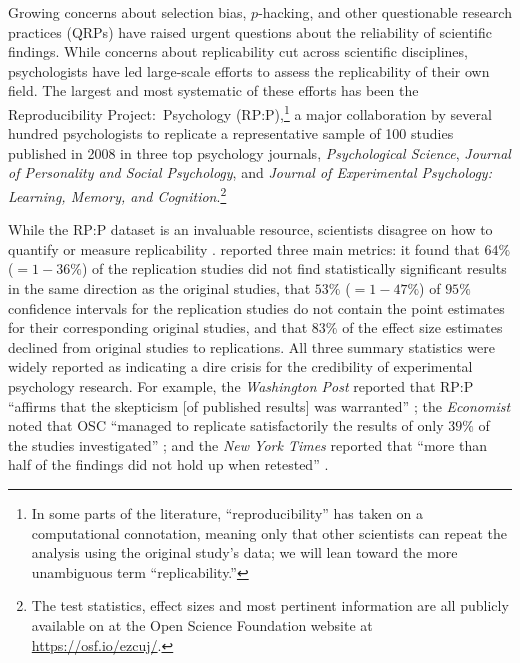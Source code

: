 \documentclass[11pt]{article}
\theoremstyle{definition}
\theoremstyle{custom}
\begin{document}
  Growing concerns about selection bias, $p$-hacking, and other questionable research practices (QRPs) have raised urgent questions about the reliability of scientific findings. While concerns about replicability cut across scientific disciplines, psychologists have led large-scale efforts to assess the replicability of their own field. The largest and most systematic of these efforts has been the Reproducibility Project:\ Psychology (RP:P),\footnote{In some parts of the literature, ``reproducibility'' has taken on a computational connotation, meaning only that other scientists can repeat the analysis using the original study's data; we will lean toward the more unambiguous term ``replicability.''} a major collaboration by several hundred psychologists to replicate a representative sample of 100 studies published in 2008 in three top psychology journals, {\em Psychological Science}, {\em Journal of Personality and Social Psychology}, and {\em Journal of Experimental Psychology: Learning, Memory, and Cognition}.\footnote{The test statistics, effect sizes and most pertinent information are all publicly available on at the Open Science Foundation website at \url{https://osf.io/ezcuj/}.}

  While the RP:P dataset is an invaluable resource, scientists disagree on how to quantify or measure replicability \citep{Goodman:2016bo,Amrhein:2017en}. \citet[OSC;][]{OpenScienceCollaboration:2015cn} reported three main metrics: it found that $64\%$ ($= 1 - 36\%$) of the replication studies did not find statistically significant results in the same direction as the original studies, that $53\%$ ($= 1 - 47\%$) of $95\%$ confidence intervals for the replication studies do not contain the point estimates for their corresponding original studies, and that $83\%$ of the effect size estimates declined from original studies to replications. All three summary statistics were widely reported as indicating a dire crisis for the credibility of experimental psychology research. For example, the {\em Washington Post} reported that RP:P ``affirms that the skepticism [of published results] was warranted'' \citep{Achenbach:2015vi}; the {\em Economist} noted that OSC ``managed to replicate satisfactorily the results of only $39\%$ of the studies investigated'' \citep{Anonymous:uoQKTVTm}; and the {\em New York Times} reported that ``more than half of the findings did not hold up when retested'' \citep{Carey:2015wp}.
\end{document}
